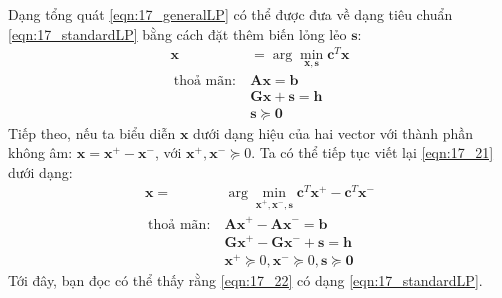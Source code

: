 {}
 
Dạng tổng quát \eqref{eqn:17_generalLP} có thể được đưa về dạng tiêu chuẩn
\eqref{eqn:17_standardLP} bằng cách đặt thêm biến lỏng lẻo $\mathbf{s}$:
\begin{equation} 
\label{eqn:17_21}
\begin{aligned}
\mathbf{x} &= \arg\min_{\mathbf{x}, \mathbf{s}} \mathbf{c}^T\mathbf{x} \\\ 
\text{thoả mãn:}~ & \mathbf{Ax} = \mathbf{b}\\\ 
& \mathbf{Gx} + \mathbf{s} = \mathbf{h} \\\ 
& \mathbf{s} \succeq \mathbf{0} 
\end{aligned}
\end{equation} 
Tiếp theo, nếu ta biểu diễn $\mathbf{x}$ dưới dạng hiệu của hai vector với thành
phần không âm: $\mathbf{x} = \mathbf{x}^+ - \mathbf{x}^-$, với
$\mathbf{x}^+, \mathbf{x}^- \succeq 0$. Ta có thể tiếp tục viết lại
\eqref{eqn:17_21} dưới dạng:
\begin{equation} 
\label{eqn:17_22}
\begin{aligned}
\mathbf{x} =& \arg\min_{\mathbf{x}^+,\mathbf{x}^-, \mathbf{s}} \mathbf{c}^T\mathbf{x}^+ - \mathbf{c}^T\mathbf{x}^- \\\ 
\text{thoả mãn:}~ & \mathbf{Ax}^+ - \mathbf{Ax}^- = \mathbf{b} \\\ 
& \mathbf{Gx}^+ - \mathbf{Gx}^- + \mathbf{s} = \mathbf{h} \\\ 
& \mathbf{x}^+ \succeq 0, \mathbf{x}^- \succeq 0, \mathbf{s} \succeq \mathbf{0} 
\end{aligned}
\end{equation} 
Tới đây, bạn đọc có thể thấy rằng \eqref{eqn:17_22} có dạng
\eqref{eqn:17_standardLP}.
 
